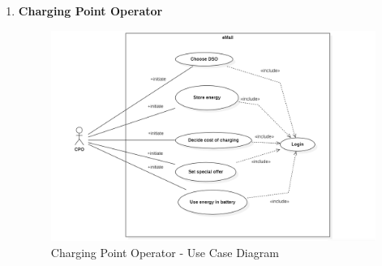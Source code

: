 \begin{enumerate}
    \item \textbf{Charging Point Operator}
    \begin{figure}[H]
        \begin{center}
            \includegraphics[width=\textwidth]{img/CPO_UseCase.PNG}
            \caption{Charging Point Operator - Use Case Diagram}
        \end{center}
    \end{figure}

\end{enumerate}
